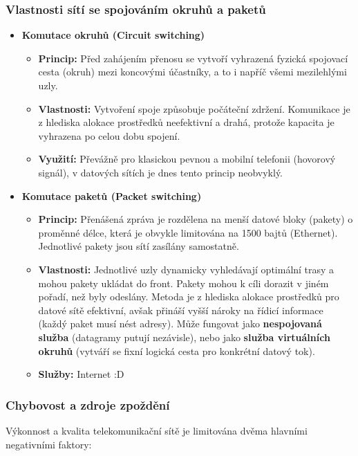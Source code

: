         \subsubsection*{Vlastnosti sítí se spojováním okruhů a paketů}
            \begin{itemize}
                \item \textbf{Komutace okruhů (Circuit switching)}
                \begin{itemize}
                    \item \textbf{Princip:} Před zahájením přenosu se vytvoří vyhrazená fyzická spojovací cesta (okruh) mezi koncovými účastníky, a to i napříč všemi mezilehlými uzly.
                    \item \textbf{Vlastnosti:} Vytvoření spoje způsobuje počáteční zdržení. Komunikace je z hlediska alokace prostředků neefektivní a drahá, protože kapacita je vyhrazena po celou dobu spojení.
                    \item \textbf{Využití:} Převážně pro klasickou pevnou a mobilní telefonii (hovorový signál), v datových sítích je dnes tento princip neobvyklý.
                \end{itemize}
                \item \textbf{Komutace paketů (Packet switching)}
                \begin{itemize}
                    \item \textbf{Princip:} Přenášená zpráva je rozdělena na menší datové bloky (pakety) o proměnné délce, která je obvykle limitována na 1500 bajtů (Ethernet). Jednotlivé pakety jsou sítí zasílány samostatně.
                    \item \textbf{Vlastnosti:} Jednotlivé uzly dynamicky vyhledávají optimální trasy a mohou pakety ukládat do front. Pakety mohou k cíli dorazit v jiném pořadí, než byly odeslány. Metoda je z hlediska alokace prostředků pro datové sítě efektivní, avšak přináší vyšší nároky na řídicí informace (každý paket musí nést adresy).  Může fungovat jako \textbf{nespojovaná služba} (datagramy putují nezávisle), nebo jako \textbf{služba virtuálních okruhů} (vytváří se fixní logická cesta pro konkrétní datový tok).
                    \item \textbf{Služby:} Internet :D
                \end{itemize}
            \end{itemize}

        \subsubsection*{Chybovost a zdroje zpoždění}
            Výkonnost a kvalita telekomunikační sítě je limitována dvěma hlavními negativními faktory:

